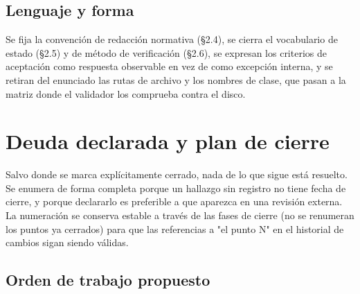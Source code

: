 \documentclass[11pt,a4paper]{article}
\begin{document}
\subsection{Lenguaje y forma}

Se fija la convención de redacción normativa (\S2.4), se cierra el vocabulario de estado
(\S2.5) y de método de verificación (\S2.6), se expresan los criterios de aceptación como
respuesta observable en vez de como excepción interna, y se retiran del enunciado las rutas de
archivo y los nombres de clase, que pasan a la matriz donde el validador los comprueba contra el
disco.

\section{Deuda declarada y plan de cierre}
\label{sec:pendientes}

Salvo donde se marca explícitamente cerrado, nada de lo que sigue está resuelto. Se enumera de
forma completa porque un hallazgo sin registro no tiene fecha de cierre, y porque declararlo es
preferible a que aparezca en una revisión externa. La numeración se conserva estable a través de
las fases de cierre (no se renumeran los puntos ya cerrados) para que las referencias a "el punto
N" en el historial de cambios sigan siendo válidas.

\subsection{Orden de trabajo propuesto}
\end{document}
